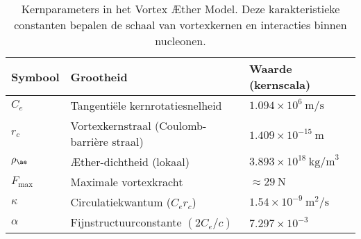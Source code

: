 \begin{table}[h!]
    \centering
    \begin{tabular}{lll}
        \hline
        Symbool & Grootheid & Waarde (kernscala)\\
        \hline
        $C_e$ & Tangentiële kernrotatiesnelheid & $1.094\times10^6~\text{m/s}$\\
        $r_c$ & Vortexkernstraal (Coulomb-barrière straal) & $1.409\times10^{-15}~\text{m}$\\
        $\rho_{\ae}$ & Æther-dichtheid (lokaal) & $3.893\times10^{18}~\text{kg/m}^3$\\
        $F_{\max}$ & Maximale vortexkracht & $\approx 29~\text{N}$\\
        $\kappa$ & Circulatiekwantum ($C_e r_c$) & $1.54\times10^{-9}~\text{m}^2/\text{s}$\\
        $\alpha$ & Fijnstructuurconstante $(2C_e/c)$ & $7.297\times10^{-3}$\\
        \hline
    \end{tabular}
    \caption{Kernparameters in het Vortex Æther Model. Deze karakteristieke constanten bepalen de schaal van vortexkernen en interacties binnen nucleonen.}
\end{table}